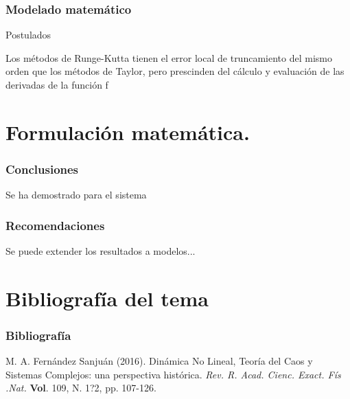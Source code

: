 \documentclass{beamer}
\begin{document}
\begin{frame}
	\frametitle{Modelado matem\'atico }
\begin{alertblock}{\begin{dinglist}{45}
			\item Postulados
	\end{dinglist}}
    \begin{minipage}{10cm}
	Los m\'etodos de Runge-Kutta tienen el error local de truncamiento del mismo orden que los m\'etodos de Taylor, pero prescinden del c\'alculo y evaluaci\'on de las derivadas de la funci\'on f
     \end{minipage}
\end{alertblock}
\end{frame}

\section{Formulaci\'on matem\'atica.}
\begin{frame}
	\frametitle{Conclusiones}
	\begin{minipage}{10cm}
	Se ha demostrado para el sistema 
	\end{minipage}
\end{frame}

\begin{frame}
	\frametitle{Recomendaciones}
	\begin{minipage}{10cm}
		Se puede extender los resultados a modelos... 
	\end{minipage}
\end{frame}
\section{Bibliograf\'ia del tema}
\begin{frame}
\frametitle{Bibliograf\'ia}
\begin{thebibliography}{99}

 M. A. Fern\'andez Sanju\'an (2016). Din\'amica No Lineal, Teor\'ia del Caos y Sistemas Complejos: una perspectiva hist\'orica. {\em Rev. R. Acad. Cienc. Exact. F\'is .Nat.} \textbf{Vol}. 109, N. 1?2, pp. 107-126.
\end{thebibliography}	
\end{frame}
\end{document}
